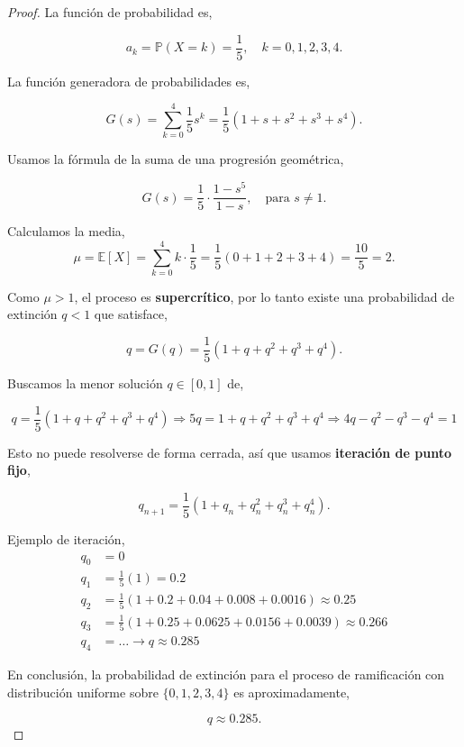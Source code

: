 \documentclass{article}
\begin{document}
\begin{proof}

La función de probabilidad es,

\[
a_k = \mathbb{P}(X = k) = \frac{1}{5}, \quad k = 0, 1, 2, 3, 4.
\]

La función generadora de probabilidades es,

\[
G(s) = \sum_{k=0}^{4} \frac{1}{5} s^k = \frac{1}{5}(1 + s + s^2 + s^3 + s^4).
\]

Usamos la fórmula de la suma de una progresión geométrica,

\[
G(s) = \frac{1}{5} \cdot \frac{1 - s^5}{1 - s}, \quad \text{para } s \neq 1.
\]


Calculamos la media,
\[
\mu = \mathbb{E}[X] = \sum_{k=0}^{4} k \cdot \frac{1}{5}
= \frac{1}{5}(0 + 1 + 2 + 3 + 4) = \frac{10}{5} = 2.
\]

Como \( \mu > 1 \), el proceso es \textbf{supercrítico}, por lo tanto existe una probabilidad de extinción \( q < 1 \) que satisface,

\[
q = G(q) = \frac{1}{5}(1 + q + q^2 + q^3 + q^4).
\]

Buscamos la menor solución \( q \in [0,1] \) de,

\[
q = \frac{1}{5}(1 + q + q^2 + q^3 + q^4)
\Rightarrow 5q = 1 + q + q^2 + q^3 + q^4
\Rightarrow 4q - q^2 - q^3 - q^4 = 1
\]

Esto no puede resolverse de forma cerrada, así que usamos \textbf{iteración de punto fijo},

\[
q_{n+1} = \frac{1}{5}(1 + q_n + q_n^2 + q_n^3 + q_n^4).
\]

Ejemplo de iteración,
\[
\begin{aligned}
q_0 &= 0 \\
q_1 &= \frac{1}{5}(1) = 0.2 \\
q_2 &= \frac{1}{5}(1 + 0.2 + 0.04 + 0.008 + 0.0016) \approx 0.25 \\
q_3 &= \frac{1}{5}(1 + 0.25 + 0.0625 + 0.0156 + 0.0039) \approx 0.266 \\
q_4 &= \dots \to q \approx 0.285
\end{aligned}
\]

En conclusión, la probabilidad de extinción para el proceso de ramificación con distribución uniforme sobre \( \{0, 1, 2, 3, 4\} \) es aproximadamente,

\[
    q \approx 0.285.
\]
\end{proof}
\end{document}
